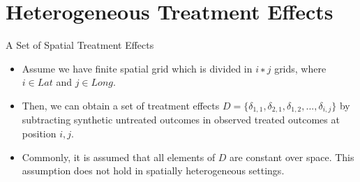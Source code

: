 \section{Heterogeneous Treatment Effects}

\begin{frame}{A Set of Spatial Treatment Effects}
\begin{itemize}
    \item Assume we have finite spatial grid which is divided in $i∗j$ grids, where $i \in Lat$ and $j \in Long$. 
    \vspace{-7pt}
    \item Then, we can obtain a set of treatment effects $D = \{\delta_{1,1}, \delta_{2,1}, \delta_{1,2}, ..., \delta_{i,j}\}$ by subtracting synthetic untreated outcomes in observed treated outcomes at position $i,j$. 
    \vspace{-7pt}
    \item Commonly, it is assumed that all elements of $D$ are constant over space. This assumption does not hold in spatially heterogeneous settings.
\end{itemize}
\end{frame}

